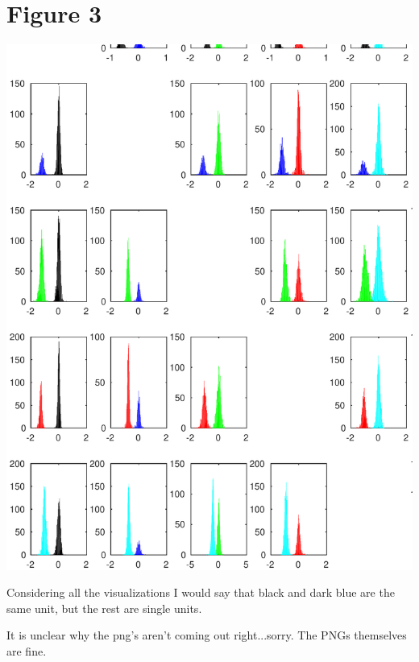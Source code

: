 \documentclass{article}
\begin{document}
\section{Figure 3}
\includegraphics[width=\textwidth]{Figure3.png}

Considering all the visualizations I would say that black and dark blue are the same unit, but the rest are single units. 

It is unclear why the png's aren't coming out right...sorry. The PNGs themselves are fine. 
\end{document}
